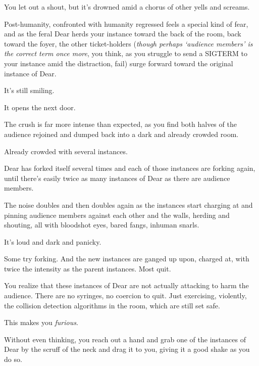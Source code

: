 You let out a shout, but it's drowned amid a chorus of other yells and screams.

Post-humanity, confronted with humanity regressed feels a special kind of fear, and as the feral Dear herds your instance toward the back of the room, back toward the foyer, the other ticket-holders (\emph{though perhaps `audience members' is the correct term once more}, you think, as you struggle to send a SIGTERM to your instance amid the distraction, fail) surge forward toward the original instance of Dear.

\vfill
\newpage

\null
\vfill

\noindent It's still smiling.

\null
\vfill

\newpage
\null
\vfill

\noindent It opens the next door.

\vfill

\newpage

\noindent The crush is far more intense than expected, as you find both halves of the audience rejoined and dumped back into a dark and already crowded room.

Already crowded with several instances.

Dear has forked itself several times and each of those instances are forking again, until there's easily twice as many instances of Dear as there are audience members.

The noise doubles and then doubles again as the instances start charging at and pinning audience members against each other and the walls, herding and shouting, all with bloodshot eyes, bared fangs, inhuman snarls.

It's loud and dark and panicky.

Some try forking. And the new instances are ganged up upon, charged at, with twice the intensity as the parent instances. Most quit.

You realize that these instances of Dear are not actually attacking to harm the audience. There are no syringes, no coercion to quit. Just exercising, violently, the collision detection algorithms in the room, which are still set safe.

This makes you \emph{furious}.


Without even thinking, you reach out a hand and grab one of the instances of Dear by the scruff of the neck and drag it to you, giving it a good shake as you do so.

